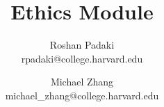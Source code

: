\documentclass[11pt]{article}
\title{Ethics Module}
\author{Roshan Padaki \\ rpadaki@college.harvard.edu \and Michael Zhang \\ michael\_zhang@college.harvard.edu }
\begin{document}
\maketitle{}
\end{document}
